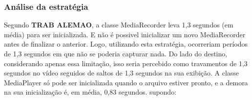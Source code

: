 \documentclass{acm_proc_article-sp}
\newcommand{\todo}[1]{\textcolor[rgb]{1.00,0.00,0.00}{\bf \uppercase{#1}}}
\begin{document}
\subsubsection{Análise da estratégia}

Segundo \todo{trab alemao}, a classe MediaRecorder leva 1,3 segundos (em média) para ser inicializada. E não é possivel inicializar um novo MediaRecorder antes de finalizar o anterior. Logo, utilizando esta estratégia, ocorreriam períodos de 1,3 segundos em que não se poderia capturar nada. Do lado do destino, considerando apenas essa limitação, isso seria percebido como travamentos de 1,3 segundos no vídeo seguidos de saltos de 1,3 segundos na sua exibição. A classe MediaPlayer só pode ser inicializada quando o arquivo estiver pronto, e a demora na sua inicialização é, em média, 0,83 segundos.
supondo:
\end{document}
